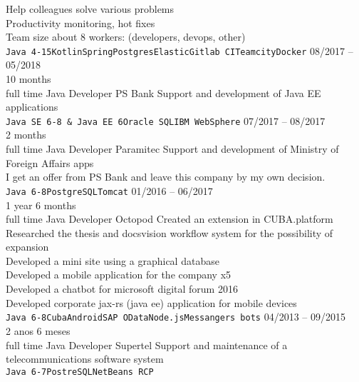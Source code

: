\begin{entrylist}
{            Help colleagues solve various problems \\
            Productivity monitoring, hot fixes \\
        Team size about 8 workers: (developers, devops, other) \\
        \texttt{Java 4-15}\slashsep\texttt{Kotlin}\slashsep\texttt{Spring}\slashsep\texttt{Postgres}\slashsep\texttt{Elastic}\slashsep\texttt{Gitlab CI}\slashsep\texttt{Teamcity}\slashsep\texttt{Docker}}
        \entry
        {08/2017 -- 05/2018\\\footnotesize{10 months\\full time}}
        {Java Developer}
        {PS Bank}
        {
            Support and development of Java EE applications \\
            \texttt{Java SE 6-8 \& Java EE 6}\slashsep\texttt{Oracle SQL}\slashsep\texttt{IBM WebSphere}}
        \entry
        {07/2017 -- 08/2017\\\footnotesize{2 months\\full time}}
        {Java Developer}
        {Paramitec}
        {
            Support and development of Ministry of Foreign Affairs apps \\
            I get an offer from PS Bank and leave this company by my own decision. \\
            \texttt{Java 6-8}\slashsep\texttt{PostgreSQL}\slashsep\texttt{Tomcat}}
        \entry
        {01/2016 -- 06/2017\\\footnotesize{1 year 6 months\\full time}}
        {Java Developer}
        {Octopod}
        {
            Created an extension in CUBA.platform \\
            Researched the thesis and docsvision workflow system for the possibility of expansion \\
            Developed a mini site using a graphical database \\
            Developed a mobile application for the company x5 \\
            Developed a chatbot for microsoft digital forum 2016 \\
            Developed corporate jax-rs (java ee) application for mobile devices\\
        \texttt{Java 6-8}\slashsep\texttt{Cuba}\slashsep\texttt{Android}\slashsep\texttt{SAP OData}\slashsep\texttt{Node.js}\slashsep\texttt{Messangers bots}}
        \entry
        {04/2013 -- 09/2015\\\footnotesize{2 anos 6 meses\\full time}}
        {Java Developer}
        {Supertel}
        {
            Support and maintenance of a telecommunications software system \\
            \texttt{Java 6-7}\slashsep\texttt{PostreSQL}\slashsep\texttt{NetBeans RCP}}


\end{entrylist}
